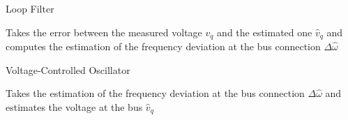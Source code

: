 \documentclass[aspectratio=169, 12pt]{beamer}
\begin{document}
\begin{frame}{Loop Filter}{\insertsection}
  \begin{figure}
     
  \end{figure}
 Takes the error between the measured voltage $v_q$ and the estimated one $\hat{v}_q$ and computes the estimation of the frequency deviation at the bus connection $\Delta \hat{\omega}$
\end{frame}

\begin{frame}{Voltage-Controlled Oscillator}{\insertsection}
  \begin{figure}
     
  \end{figure}
 Takes the estimation of the frequency deviation at the bus connection $\Delta \hat{\omega}$  and estimates the voltage at the bus $\hat{v}_q$ 
\end{frame}
      
\end{document}
